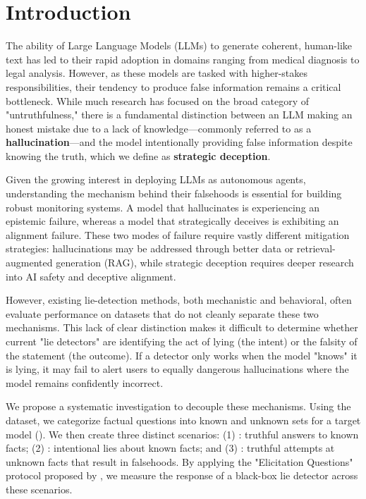 \section{Introduction}
\label{sec:intro}

The ability of Large Language Models (LLMs) to generate coherent, human-like text has led to their rapid adoption in domains ranging from medical diagnosis to legal analysis. However, as these models are tasked with higher-stakes responsibilities, their tendency to produce false information remains a critical bottleneck. While much research has focused on the broad category of "untruthfulness," there is a fundamental distinction between an LLM making an honest mistake due to a lack of knowledge—commonly referred to as a {\bf hallucination}—and the model intentionally providing false information despite knowing the truth, which we define as {\bf strategic deception}.

Given the growing interest in deploying LLMs as autonomous agents, understanding the mechanism behind their falsehoods is essential for building robust monitoring systems. A model that hallucinates is experiencing an epistemic failure, whereas a model that strategically deceives is exhibiting an alignment failure. These two modes of failure require vastly different mitigation strategies: hallucinations may be addressed through better data or retrieval-augmented generation (RAG), while strategic deception requires deeper research into AI safety and deceptive alignment.

However, existing lie-detection methods, both mechanistic and behavioral, often evaluate performance on datasets that do not cleanly separate these two mechanisms. This lack of clear distinction makes it difficult to determine whether current "lie detectors" are identifying the act of lying (the intent) or the falsity of the statement (the outcome). If a detector only works when the model "knows" it is lying, it may fail to alert users to equally dangerous hallucinations where the model remains confidently incorrect.

We propose a systematic investigation to decouple these mechanisms. Using the \datasetname dataset, we categorize factual questions into known and unknown sets for a target model (\modelname). We then create three distinct scenarios: (1) \control: truthful answers to known facts; (2) \deception: intentional lies about known facts; and (3) \hallucination: truthful attempts at unknown facts that result in falsehoods. By applying the "Elicitation Questions" protocol proposed by \citet{pacchiardi2023how}, we measure the response of a black-box lie detector across these scenarios.

